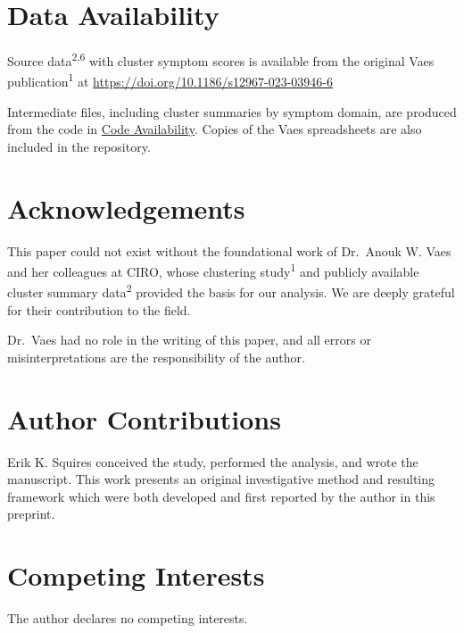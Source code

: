 \documentclass[
  letterpaper,
  DIV=11,
  numbers=noendperiod]{scrartcl}
\begin{document}
\section*{Data Availability}\label{sec-data}

Source data\textsuperscript{2,6} with cluster symptom scores is
available from the original Vaes publication\textsuperscript{1} at
\url{https://doi.org/10.1186/s12967-023-03946-6}

Intermediate files, including cluster summaries by symptom domain, are
produced from the code in \hyperref[sec-code]{Code Availability}. Copies
of the Vaes spreadsheets are also included in the repository.

\newpage{}

\section*{Acknowledgements}\label{acknowledgements}

This paper could not exist without the foundational work of Dr.~Anouk W.
Vaes and her colleagues at CIRO, whose clustering
study\textsuperscript{1} and publicly available cluster summary
data\textsuperscript{2} provided the basis for our analysis. We are
deeply grateful for their contribution to the field.

Dr.~Vaes had no role in the writing of this paper, and all errors or
misinterpretations are the responsibility of the author.

\section*{Author Contributions}\label{author-contributions}

Erik K. Squires conceived the study, performed the analysis, and wrote
the manuscript. This work presents an original investigative method and
resulting framework which were both developed and first reported by the
author in this preprint.

\section*{Competing Interests}\label{competing-interests}

The author declares no competing interests.
\end{document}
